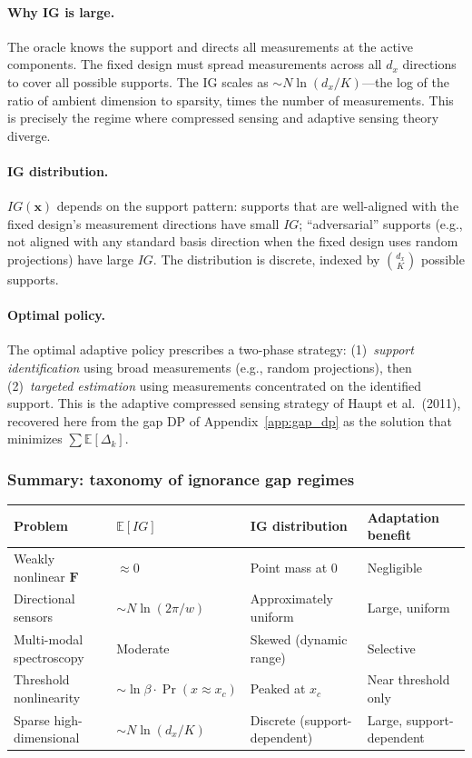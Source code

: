 \documentclass[11pt,a4paper]{article}
\newcommand{\E}{\mathbb{E}}
\begin{document}
\paragraph{Why IG is large.}
The oracle knows the support and directs all measurements at the active components.  The fixed design must spread measurements across all $d_x$ directions to cover all possible supports.  The IG scales as $\sim N \ln(d_x / K)$---the log of the ratio of ambient dimension to sparsity, times the number of measurements.  This is precisely the regime where compressed sensing and adaptive sensing theory diverge.

\paragraph{IG distribution.}
$IG(\bm{x})$ depends on the support pattern: supports that are well-aligned with the fixed design's measurement directions have small $IG$; ``adversarial'' supports (e.g., not aligned with any standard basis direction when the fixed design uses random projections) have large $IG$.  The distribution is discrete, indexed by $\binom{d_x}{K}$ possible supports.

\paragraph{Optimal policy.}
The optimal adaptive policy prescribes a two-phase strategy: (1)~\emph{support identification} using broad measurements (e.g., random projections), then (2)~\emph{targeted estimation} using measurements concentrated on the identified support.  This is the adaptive compressed sensing strategy of Haupt et al.\ (2011), recovered here from the gap DP of Appendix~\ref{app:gap_dp} as the solution that minimizes $\sum \E[\Delta_k]$.

\subsubsection{Summary: taxonomy of ignorance gap regimes}

\begin{center}
\begin{tabular}{@{}llll@{}}
\toprule
Problem & $\E[IG]$ & IG distribution & Adaptation benefit \\
\midrule
Weakly nonlinear $\bm{F}$ & $\approx 0$ & Point mass at 0 & Negligible \\
Directional sensors & $\sim N\ln(2\pi/w)$ & Approximately uniform & Large, uniform \\
Multi-modal spectroscopy & Moderate & Skewed (dynamic range) & Selective \\
Threshold nonlinearity & $\sim \ln\beta \cdot \Pr(x \approx x_c)$ & Peaked at $x_c$ & Near threshold only \\
Sparse high-dimensional & $\sim N\ln(d_x/K)$ & Discrete (support-dependent) & Large, support-dependent \\
\bottomrule
\end{tabular}
\end{center}
\end{document}

